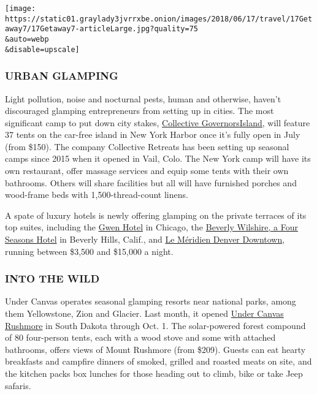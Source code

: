 \texttt{[image: https://static01.graylady3jvrrxbe.onion/images/2018/06/17/travel/17Getaway7/17Getaway7-articleLarge.jpg?quality=75\\\&auto=webp\\\&disable=upscale]}

\hypertarget{urban-glamping}{%
\subsubsection{URBAN GLAMPING}\label{urban-glamping}}

Light pollution, noise and nocturnal pests, human and otherwise, haven't
discouraged glamping entrepreneurs from setting up in cities. The most
significant camp to put down city stakes,
\href{https://www.collectiveretreats.com/retreat/collective-governors-island/}{Collective
Governors}\href{https://www.collectiveretreats.com/retreat/collective-governors-island/}{Island},
will feature 37 tents on the car-free island in New York Harbor once
it's fully open in July (from \$150). The company Collective Retreats
has been setting up seasonal camps since 2015 when it opened in Vail,
Colo. The New York camp will have its own restaurant, offer massage
services and equip some tents with their own bathrooms. Others will
share facilities but all will have furnished porches and wood-frame beds
with 1,500-thread-count linens.

A spate of luxury hotels is newly offering glamping on the private
terraces of its top suites, including the
\href{http://www.thegwenchicago.com/}{Gwen Hotel} in Chicago, the
\href{https://www.fourseasons.com/beverlywilshire/}{Beverly Wilshire, a
Four Seasons Hotel} in Beverly Hills, Calif., and
\href{http://www.lemeridiendenverdowntown.com/}{Le Méridien Denver
Downtown}, running between \$3,500 and \$15,000 a night.

\hypertarget{into-the-wild}{%
\subsubsection{INTO THE WILD}\label{into-the-wild}}

Under Canvas operates seasonal glamping resorts near national parks,
among them Yellowstone, Zion and Glacier. Last month, it opened
\href{https://www.undercanvas.com/camps/mount-rushmore/}{Under Canvas
Rushmore} in South Dakota through Oct. 1. The solar-powered forest
compound of 80 four-person tents, each with a wood stove and some with
attached bathrooms, offers views of Mount Rushmore (from \$209). Guests
can eat hearty breakfasts and campfire dinners of smoked, grilled and
roasted meats on site, and the kitchen packs box lunches for those
heading out to climb, bike or take Jeep safaris.

